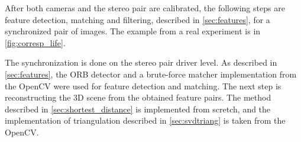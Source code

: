 After both cameras and the stereo pair are calibrated, the following steps are feature detection, matching and filtering, described in \autoref{sec:features}, for a synchronized pair of images. 
The example from a real experiment is in \autoref{fig:corresp_life}.

The synchronization is done on the stereo pair driver level.
As described in \autoref{sec:features}, the ORB detector and a brute-force matcher implementation from the OpenCV were used for feature detection and matching.
The next step is reconstructing the 3D scene from the obtained feature pairs.
The method described in \autoref{sec:shortest_distance} is implemented from scretch, and the implementation of triangulation described in \autoref{sec:svdtriang} is taken from the OpenCV.


